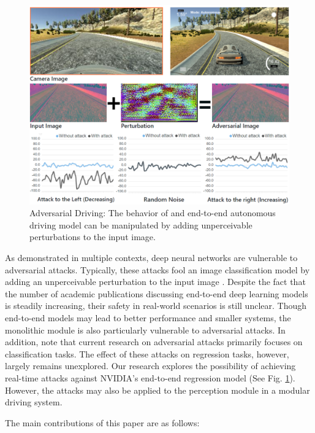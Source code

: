 \begin{figure}[tbp]
    \centering
    \includegraphics[width=0.76 \textwidth]{figures/chapter_driving/overview.png}
    \caption{Adversarial Driving: The behavior of and end-to-end autonomous driving model can be manipulated by adding unperceivable perturbations to the input image.}
    \label{fig:adv_drv}
\end{figure} 

As demonstrated in multiple contexts, deep neural networks are vulnerable to adversarial attacks. Typically, these attacks fool an image classification model by adding an unperceivable perturbation to the input image \citep{goodfellow2014explaining}. Despite the fact that the number of academic publications discussing end-to-end deep learning models is steadily increasing, their safety in real-world scenarios is still unclear. Though end-to-end models may lead to better performance and smaller systems, the monolithic module is also particularly vulnerable to adversarial attacks. In addition, note that current research on adversarial attacks primarily focuses on classification tasks. The effect of these attacks on regression tasks, however, largely remains unexplored. Our research explores the possibility of achieving real-time attacks against NVIDIA's end-to-end regression model (See Fig. \ref{fig:adv_drv}). However, the attacks may also be applied to the perception module in a modular driving system.

The main contributions of this paper are as follows: 

